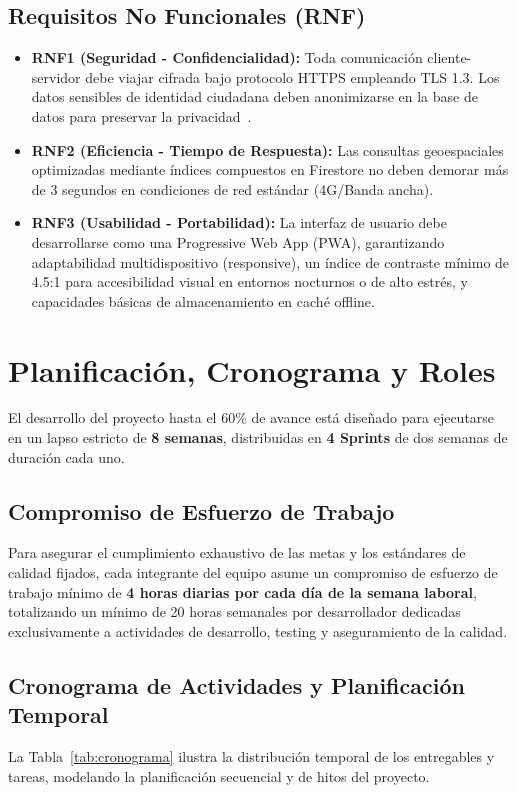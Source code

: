 \documentclass[conference]{IEEEtran}
\begin{document}
\subsection{Requisitos No Funcionales (RNF)}
\begin{itemize}
    \item \textbf{RNF1 (Seguridad - Confidencialidad):} Toda comunicación cliente-servidor debe viajar cifrada bajo protocolo HTTPS empleando TLS 1.3. Los datos sensibles de identidad ciudadana deben anonimizarse en la base de datos para preservar la privacidad~\cite{rfc8446}.
    \item \textbf{RNF2 (Eficiencia - Tiempo de Respuesta):} Las consultas geoespaciales optimizadas mediante índices compuestos en Firestore no deben demorar más de 3 segundos en condiciones de red estándar (4G/Banda ancha).
    \item \textbf{RNF3 (Usabilidad - Portabilidad):} La interfaz de usuario debe desarrollarse como una Progressive Web App (PWA), garantizando adaptabilidad multidispositivo (responsive), un índice de contraste mínimo de 4.5:1 para accesibilidad visual en entornos nocturnos o de alto estrés, y capacidades básicas de almacenamiento en caché offline.
\end{itemize}

\section{Planificación, Cronograma y Roles}
El desarrollo del proyecto hasta el 60\% de avance está diseñado para ejecutarse en un lapso estricto de \textbf{8 semanas}, distribuidas en \textbf{4 Sprints} de dos semanas de duración cada uno.

\subsection{Compromiso de Esfuerzo de Trabajo}
Para asegurar el cumplimiento exhaustivo de las metas y los estándares de calidad fijados, cada integrante del equipo asume un compromiso de esfuerzo de trabajo mínimo de \textbf{4 horas diarias por cada día de la semana laboral}, totalizando un mínimo de 20 horas semanales por desarrollador dedicadas exclusivamente a actividades de desarrollo, testing y aseguramiento de la calidad.

\subsection{Cronograma de Actividades y Planificación Temporal}
La Tabla~\ref{tab:cronograma} ilustra la distribución temporal de los entregables y tareas, modelando la planificación secuencial y de hitos del proyecto.
\end{document}
